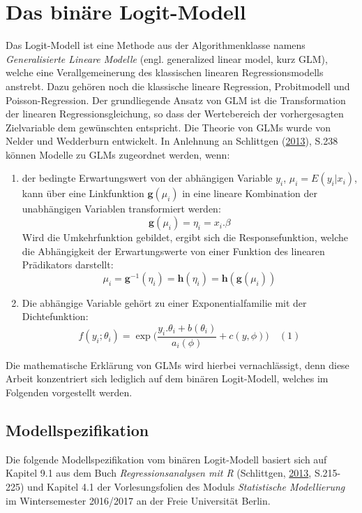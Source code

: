 \documentclass[12pt,]{article}
\providecommand{\tightlist}{%
  \setlength{\itemsep}{0pt}\setlength{\parskip}{0pt}}
\begin{document}
\section{Das binäre Logit-Modell}\label{das-binare-logit-modell}

Das Logit-Modell ist eine Methode aus der Algorithmenklasse namens
\emph{Generalisierte Lineare Modelle} (engl. generalized linear model,
kurz GLM), welche eine Verallgemeinerung des klassischen linearen
Regressionsmodells anstrebt. Dazu gehören noch die klassische lineare
Regression, Probitmodell und Poisson-Regression. Der grundliegende
Ansatz von GLM ist die Transformation der linearen Regressionsgleichung,
so dass der Wertebereich der vorhergesagten Zielvariable dem gewünschten
entspricht. Die Theorie von GLMs wurde von Nelder und Wedderburn
entwickelt. In Anlehnung an Schlittgen
(\protect\hyperlink{ref-schlittgen2013regressionsanalysen}{2013}), S.238
können Modelle zu GLMs zugeordnet werden, wenn:

\begin{enumerate}
\def\labelenumi{\arabic{enumi}.}
\tightlist
\item
  der bedingte Erwartungswert von der abhängigen Variable \(y_i\),
  \(\mu_i = E(y_i|x_i)\), kann über eine Linkfunktion
  \(\mathbf{g}(\mu_i)\) in eine lineare Kombination der unabhängigen
  Variablen transformiert werden:
  \[\mathbf{g}(\mu_i) = \eta_i = x_i.\beta\] Wird die Umkehrfunktion
  gebildet, ergibt sich die Responsefunktion, welche die Abhängigkeit
  der Erwartungswerte von einer Funktion des linearen Prädikators
  darstellt:
  \[\mu_i = \mathbf{g}^{-1}(\eta_i) = \mathbf{h}(\eta_i) =  \mathbf{h}(\mathbf{g}(\mu_i))
  \]
\item
  Die abhängige Variable gehört zu einer Exponentialfamilie mit der
  Dichtefunktion: \[
  f(y_i;\theta_i) = \exp \Bigg( \frac{y_i.\theta_i + b(\theta_i)}{a_i(\phi)} + c(y,\phi) \Bigg) \quad (1)
  \]
\end{enumerate}

Die mathematische Erklärung von GLMs wird hierbei vernachlässigt, denn
diese Arbeit konzentriert sich lediglich auf dem binären Logit-Modell,
welches im Folgenden vorgestellt werden.

\subsection{Modellspezifikation}\label{modellspezifikation}

Die folgende Modellspezifikation vom binären Logit-Modell basiert sich
auf Kapitel 9.1 aus dem Buch \emph{Regressionsanalysen mit R}
(Schlittgen,
\protect\hyperlink{ref-schlittgen2013regressionsanalysen}{2013},
S.215-225) und Kapitel 4.1 der Vorlesungsfolien des Moduls
\emph{Statistische Modellierung} im Wintersemester 2016/2017 an der
Freie Universität Berlin.
\end{document}
